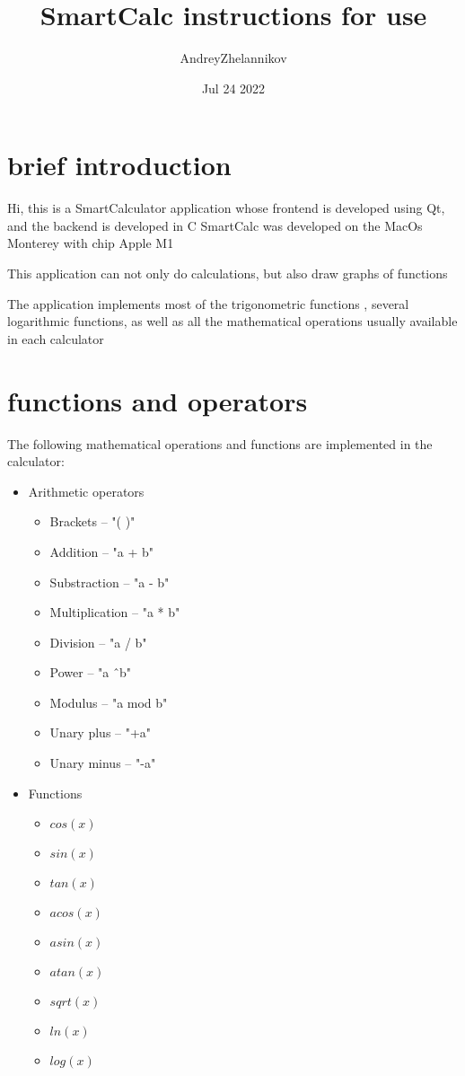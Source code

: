 \documentclass[12pt, a4paper]{article}
\title{SmartCalc instructions for use}
\author{AndreyZhelannikov}
\date{Jul 24 2022}
\begin{document}
\maketitle

\pagebreak

\tableofcontents

\pagebreak

\section{brief introduction}

Hi, this is a SmartCalculator application whose frontend is developed using Qt, and the backend is developed in C
SmartCalc was developed on the MacOs Monterey with chip Apple M1

This application can not only do calculations, but also draw graphs of functions

The application implements most of the trigonometric functions
, several logarithmic functions, as well as all the mathematical operations 
usually available in each calculator

\pagebreak

\section{functions and operators}

The following mathematical operations and functions are implemented in the calculator:
  \begin{itemize}
    \item Arithmetic operators
    \begin{itemize}
      \item Brackets -- "( )"
      \item Addition -- "a + b"
      \item Substraction -- "a - b"
      \item Multiplication -- "a * b"
      \item Division -- "a / b"
      \item Power -- "a \^\ b"
      \item Modulus -- "a mod b"
      \item Unary plus -- "+a"
      \item Unary minus -- "-a"
    \end{itemize}
    \item Functions
    \begin{itemize}
      \item $cos(x)$
      \item $sin(x)$
      \item $tan(x)$
      \item $acos(x)$
      \item $asin(x)$
      \item $atan(x)$
      \item $sqrt(x)$
      \item $ln(x)$
      \item $log(x)$
    \end{itemize}
  \end{itemize}
\end{document}
